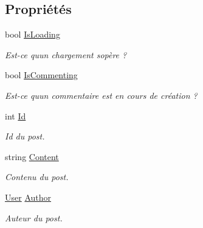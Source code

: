 \subsection*{Propriétés}
\begin{DoxyCompactItemize}
\item 
bool \hyperlink{class_boxes_1_1_view_models_1_1_post_view_model_a3c98327f7674f9f8cce196006962d775}{Is\+Loading}
\begin{DoxyCompactList}\small\item\em Est-\/ce qu\textquotesingle{}un chargement s\textquotesingle{}opère ? \end{DoxyCompactList}\item 
bool \hyperlink{class_boxes_1_1_view_models_1_1_post_view_model_ac67d855603160541cad73f0969374e34}{Is\+Commenting}
\begin{DoxyCompactList}\small\item\em Est-\/ce qu\textquotesingle{}un commentaire est en cours de création ? \end{DoxyCompactList}\item 
int \hyperlink{class_boxes_1_1_view_models_1_1_post_view_model_a7f2adb3a5ef1d304b927373802ad0093}{Id}
\begin{DoxyCompactList}\small\item\em Id du post. \end{DoxyCompactList}\item 
string \hyperlink{class_boxes_1_1_view_models_1_1_post_view_model_ab5837b34c294e08284f848eec3fb4998}{Content}
\begin{DoxyCompactList}\small\item\em Contenu du post. \end{DoxyCompactList}\item 
\hyperlink{class_boxes_1_1_models_1_1_user}{User} \hyperlink{class_boxes_1_1_view_models_1_1_post_view_model_a15d5aaeac36ca691fe320b6abd9e278d}{Author}
\begin{DoxyCompactList}\small\item\em Auteur du post. \end{DoxyCompactList}\item 

\end{DoxyCompactItemize}
